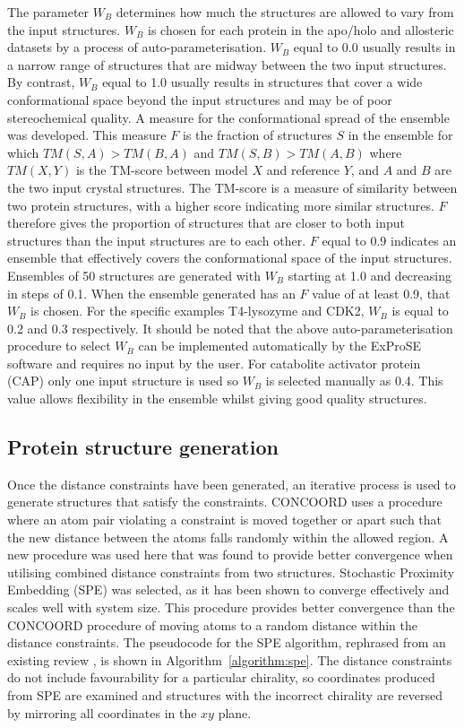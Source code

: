 The parameter $W_{B}$ determines how much the structures are allowed to vary from the input structures.
$W_{B}$ is chosen for each protein in the apo/holo and allosteric datasets by a process of auto-parameterisation.
$W_{B}$ equal to 0.0 usually results in a narrow range of structures that are midway between the two input structures.
By contrast, $W_{B}$ equal to 1.0 usually results in structures that cover a wide conformational space beyond the input structures and may be of poor stereochemical quality.
A measure for the conformational spread of the ensemble was developed.
This measure $F$ is the fraction of structures $S$ in the ensemble for which $TM(S,A) > TM(B,A)$ and $TM(S,B) > TM(A,B)$ where $TM(X,Y)$ is the TM-score between model $X$ and reference $Y$, and $A$ and $B$ are the two input crystal structures.
The TM-score is a measure of similarity between two protein structures, with a higher score indicating more similar structures.
$F$ therefore gives the proportion of structures that are closer to both input structures than the input structures are to each other.
$F$ equal to 0.9 indicates an ensemble that effectively covers the conformational space of the input structures.
Ensembles of 50 structures are generated with $W_{B}$ starting at 1.0 and decreasing in steps of 0.1.
When the ensemble generated has an $F$ value of at least 0.9, that $W_{B}$ is chosen.
For the specific examples T4-lysozyme and CDK2, $W_{B}$ is equal to 0.2 and 0.3 respectively.
It should be noted that the above auto-parameterisation procedure to select $W_{B}$ can be implemented automatically by the ExProSE software and requires no input by the user.
For catabolite activator protein (CAP) only one input structure is used so $W_{B}$ is selected manually as 0.4.
This value allows flexibility in the ensemble whilst giving good quality structures.


\subsection{Protein structure generation}

Once the distance constraints have been generated, an iterative process is used to generate structures that satisfy the constraints.
CONCOORD uses a procedure where an atom pair violating a constraint is moved together or apart such that the new distance between the atoms falls randomly within the allowed region.
A new procedure was used here that was found to provide better convergence when utilising combined distance constraints from two structures.
Stochastic Proximity Embedding (SPE) \cite{Agrafiotis2013} was selected, as it has been shown to converge effectively and scales well with system size.
This procedure provides better convergence than the CONCOORD procedure of moving atoms to a random distance within the distance constraints.
The pseudocode for the SPE algorithm, rephrased from an existing review \cite{Agrafiotis2013}, is shown in Algorithm~\ref{algorithm:spe}.
The distance constraints do not include favourability for a particular chirality, so coordinates produced from SPE are examined and structures with the incorrect chirality are reversed by mirroring all coordinates in the $xy$ plane.


